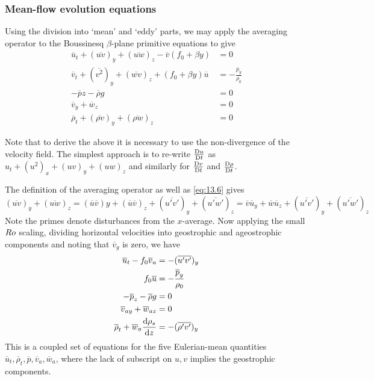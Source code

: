 \documentclass{jknotes}
\begin{document}
\subsubsection{Mean-flow evolution equations}
Using the division into `mean' and `eddy' parts, we may apply the averaging
operator to the Boussinesq $\beta$-plane primitive equations to give
\begin{align}
	\overline{u}_t + (\overline{uv})_y + (\overline{uw})_z
	-\overline{v}(f_0+\beta y) &= 0 \\
	\overline{v}_t + (\overline{v^2})_y + (\overline{wv})_z + (f_0 + \beta y)
	\overline{u} &= -\frac{\overline{p}_y}{\rho_0} \\
	-\overline{p}z - \overline{\rho} g &= 0 \\
	\overline{v}_y + \overline{w}_z &= 0 \label{eq:13.6}\\
	\overline{\rho}_t + (\overline{\rho v})_y + (\overline{\rho w})_z &= 0
\end{align}

Note that to derive the above it is necessary to use the non-divergence of the
velocity field. The simplest approach is to re-write $\frac{\mathrm{D} u}{\mathrm{D}
	t}$ as $u_t + (u^2)_x + (uv)_y + (uw)_z$ and similarly for $\frac{\mathrm{D}
v}{\mathrm{D} t}$ and $\frac{\mathrm{D} \rho}{\mathrm{D} t}$. 

The definition of the averaging operator as well as \eqref{eq:13.6} gives
\begin{equation}
	(\overline{uv})_y + (\overline{uw})_z = (\overline{u}\overline{v})y +
	(\overline{u}\overline{v})_z + (\overline{u'v'})_y + (\overline{u'w'})_z =
	\overline{v}\overline{u}_y + \overline{w}\overline{u}_z +
	(\overline{u'v'})_y + (\overline{u'w'})_z
\end{equation}
Note the primes denote disturbances from the $x$-average. Now applying the
small $Ro$ scaling, dividing horizontal velocities into geostrophic and
ageostrophic components and noting that $\overline{v}_g$ is zero, we have
\begin{align}
	\overline{u}_t - f_0 \overline{v}_a &= -(\overline{u'v'})_y
	\label{eq:13.8}\\
	f_0 \overline{u} &= -\frac{\overline{p}_y}{\rho_0} \label{eq:13.9}\\
	-\overline{p}_z - \overline{\rho}g &= 0 \label{eq:13.10}\\
	\overline{v}_{ay} + \overline{w}_{az} &= 0 \label{eq:13.11}\\
	\overline{\rho}_t + \overline{w}_a \frac{\diffd \rho_s}{\diffd z} &=
	-(\overline{\rho' v'})_y\label{eq:13.12}
\end{align}
This is a coupled set of equations for the five Eulerian-mean quantities
$\overline{u}_t, \overline{\rho}_t, \overline{p}, \overline{v}_a,
\overline{w}_a$, where the lack of subscript on $u, v$ implies the geostrophic
components.
\end{document}
